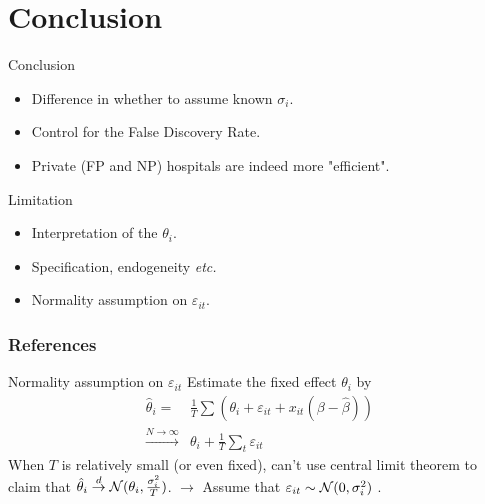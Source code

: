 \documentclass[10pt,mathserif,aspectratio=169]{beamer}
\begin{document}
\section{Conclusion}

\begin{frame}{Conclusion}
  \begin{itemize}
    \item Difference in whether to assume known $\sigma_i$.
    \item Control for the False Discovery Rate.
    \item Private (FP and NP) hospitals are indeed more "efficient".
  \end{itemize}
\end{frame}

\begin{frame}[label=limitation]{Limitation}
  \begin{itemize}\itemsep=12pt
    \item Interpretation of the $\theta_i$.
    \item Specification, endogeneity \textit{etc.}
    \item Normality assumption on $\varepsilon_{it}$.
          \hyperlink{normality}{}
  \end{itemize}
\end{frame}

\begin{frame}[allowframebreaks]
  \frametitle{References}
  
  
\end{frame}

\appendix

\begin{frame}[label=normality]{Normality assumption on $\varepsilon_{it}$}
  Estimate the fixed effect $\theta_i$ by
  \begin{align*}
    \hat{\theta}_i =                       & \frac{1}{T}\sum(\theta_i+\varepsilon_{it}+x_{it}(\beta-\hat{\beta})) \\
    \overset{N\to \infty}{\longrightarrow} & \theta_i+\frac{1}{T}\sum_t \varepsilon_{it}
  \end{align*}
  When $T$ is relatively small (or even fixed), can't use central limit theorem to claim that $\hat{\theta}_i \overset{d}{\to} \mathcal{N}(\theta_i,\frac{\sigma_i^2}{T})$.
  $\longrightarrow$ Assume that $\varepsilon_{it} \sim \mathcal{N}(0,\sigma_i^2)$ .
  \hyperlink{observation}{}   \hyperlink{limitation}{}
\end{frame}
\end{document}
